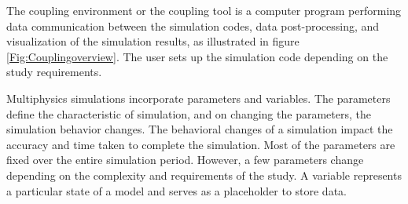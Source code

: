  The coupling environment or the coupling tool is a computer program performing data communication between the simulation codes, data post-processing, and visualization of the simulation results, as illustrated in figure \ref{Fig:Couplingoverview}. The user sets up the simulation code depending on the study requirements. 
 
 Multiphysics simulations incorporate parameters and variables. The parameters define the characteristic of simulation, and on changing the parameters, the simulation behavior changes. The behavioral changes of a simulation impact the accuracy and time taken to complete the simulation. Most of the parameters are fixed over the entire simulation period. However, a few parameters change depending on the complexity and requirements of the study. A variable represents a particular state of a model and serves as a placeholder to store data. 
 
